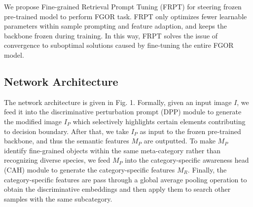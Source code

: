 \documentclass[letterpaper]{article} %
\begin{document}

 
We propose Fine-grained Retrieval Prompt Tuning (FRPT) for steering frozen pre-trained model to perform FGOR task. FRPT only optimizes fewer learnable parameters within sample prompting and feature adaption, and keeps the backbone frozen during training. In this way, FRPT solves the issue of convergence to suboptimal solutions caused by fine-tuning the entire FGOR model.



\subsection{Network Architecture}
The network architecture is given in Fig. 1.
Formally, given an input image $ I $, we feed it into the discriminative perturbation prompt (DPP) module to generate the modified image $ I_P $ which selectively highlights certain elements contributing to decision boundary. After that, we take $ I_P $ as input to the frozen pre-trained backbone, and thus the semantic features $ M_P $ are outputted. 
To make $M_P$ identify fine-grained objects within the same meta-category rather than recognizing diverse species, we feed $ M_P $ into the category-specific awareness head (CAH) module to generate the category-specific features $ M_R $.  Finally, the category-specific features are pass through a global average pooling operation to obtain the discriminative embeddings and then apply them to search other samples with the same subcategory. %



\end{document}
